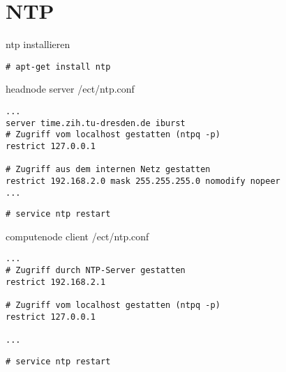 \chapter{NTP}
ntp installieren
\begin{lstlisting}[style=Bash]
# apt-get install ntp
\end{lstlisting}
headnode server /ect/ntp.conf
\begin{lstlisting}[style=Bash]
...
server time.zih.tu-dresden.de iburst
# Zugriff vom localhost gestatten (ntpq -p)
restrict 127.0.0.1
 
# Zugriff aus dem internen Netz gestatten
restrict 192.168.2.0 mask 255.255.255.0 nomodify nopeer
...
\end{lstlisting}
\begin{lstlisting}[style=Bash]
# service ntp restart
\end{lstlisting}

computenode client /ect/ntp.conf
\begin{lstlisting}[style=Bash]
...
# Zugriff durch NTP-Server gestatten
restrict 192.168.2.1
 
# Zugriff vom localhost gestatten (ntpq -p)
restrict 127.0.0.1
 
...
\end{lstlisting}

\begin{lstlisting}[style=Bash]
# service ntp restart
\end{lstlisting}
